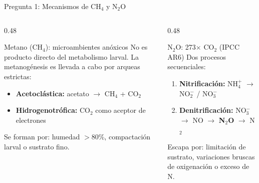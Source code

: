 \documentclass[aspectratio=169, 11pt]{beamer}
\begin{document}
\begin{frame}{Pregunta 1: Mecanismos de CH$_4$ y N$_2$O}
\begin{columns}[T]
\begin{column}{0.48\textwidth}
\begin{alertblock}{Metano (CH$_4$): microambientes anóxicos}
\footnotesize
No es producto directo del metabolismo larval. La metanogénesis es llevada a cabo por arqueas estrictas:
\begin{itemize}
    \item \textbf{Acetoclástica:} acetato $\rightarrow$ CH$_4$ + CO$_2$
    \item \textbf{Hidrogenotrófica:} CO$_2$ como aceptor de electrones
\end{itemize}
Se forman por: humedad $>80$\%, compactación larval o sustrato fino.
\end{alertblock}
\end{column}
\begin{column}{0.48\textwidth}
\begin{alertblock}{N$_2$O: 273$\times$ CO$_2$ (IPCC AR6)}
\footnotesize
Dos procesos secuenciales:
\begin{enumerate}
    \item \textbf{Nitrificación:} NH$_4^+$ $\rightarrow$ NO$_2^-$ / NO$_3^-$
    \item \textbf{Denitrificación:} NO$_3^-$ $\rightarrow$ NO $\rightarrow$ \textbf{N$_2$O} $\rightarrow$ N$_2$
\end{enumerate}
Escapa por: limitación de sustrato, variaciones bruscas de oxigenación o exceso de N.
\end{alertblock}
\end{column}
\end{columns}
\end{frame}
\end{document}
